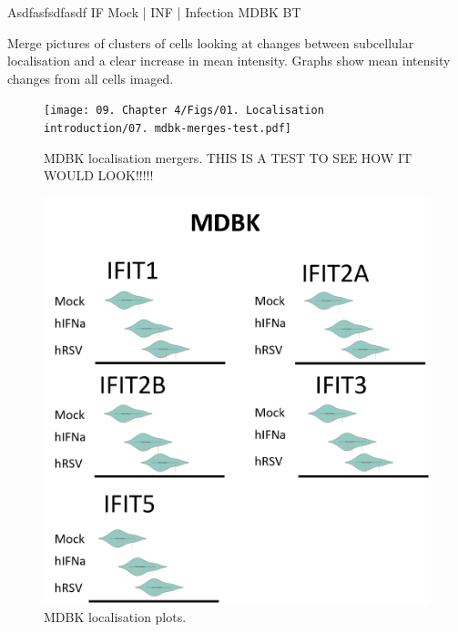 Asdfasfsdfasdf \newline
IF Mock | INF | Infection \newline
MDBK BT

Merge pictures of clusters of cells looking at changes between subcellular localisation and a clear increase in mean intensity. Graphs show mean intensity changes from all cells imaged.

\begin{figure}
    \centering
    \texttt{[image: 09. Chapter 4/Figs/01. Localisation introduction/07. mdbk-merges-test.pdf]}
    \caption[MDBK localisation mergers.]{MDBK localisation mergers. THIS IS A TEST TO SEE HOW IT WOULD LOOK!!!!!}
    \label{fig:MDBK localisation mergers}
\end{figure}


\begin{figure}
    \centering
    \includegraphics[width=1\linewidth]{09. Chapter 4/Figs/01. Localisation introduction/08. mdbk plots.png}
    \caption[MDBK localisation plots.]{MDBK localisation plots.}
    \label{fig:MDBK localisation plots}
\end{figure}
